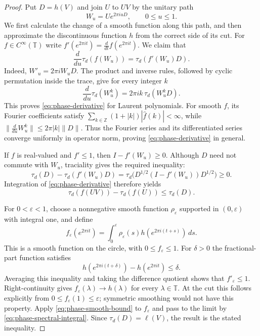\begin{proof}
Put $D=h(V)$ and join $U$ to $UV$ by the unitary path
\[
 W_u=Ue^{2\pi i uD},\qquad 0\leq u\leq1.
\]
We first calculate the change of a smooth function along this path, and
then approximate the discontinuous function $h$ from the correct side of
its cut.  For $f\in C^\infty(\mathbb T)$ write
$f'(e^{2\pi it})=\frac{d}{dt}f(e^{2\pi it})$.  We claim that
\begin{equation}\label{eq:phase-derivative}
 \frac{d}{du}\tau_d(f(W_u))=\tau_d(f'(W_u)D).
\end{equation}
Indeed, $W'_u=2\pi iW_uD$.  The product and inverse rules, followed by
cyclic permutation inside the trace, give for every integer $k$
\[
 \frac{d}{du}\tau_d(W_u^k)=2\pi i k\,\tau_d(W_u^kD).
\]
This proves \eqref{eq:phase-derivative} for Laurent polynomials.  For smooth
$f$, its Fourier coefficients satisfy
$\sum_{k\in\mathbb Z}(1+|k|)|\widehat f(k)|<\infty$, while
$\|\frac{d}{du}W_u^k\|\leq2\pi|k|\|D\|$.  Thus the Fourier series and
its differentiated series converge uniformly in operator norm, proving
\eqref{eq:phase-derivative} in general.

If $f$ is real-valued and $f'\leq1$, then $I-f'(W_u)\geq0$.  Although
$D$ need not commute with $W_u$, traciality gives the required inequality:
\[
 \tau_d(D)-\tau_d(f'(W_u)D)
 =\tau_d\bigl(D^{1/2}(I-f'(W_u))D^{1/2}\bigr)\geq0.
\]
Integration of \eqref{eq:phase-derivative} therefore yields
\begin{equation}\label{eq:phase-smooth-bound}
 \tau_d(f(UV))-\tau_d(f(U))\leq\tau_d(D).
\end{equation}

For $0<\varepsilon<1$, choose a nonnegative smooth function
$\rho_\varepsilon$ supported in $(0,\varepsilon)$ with integral one, and
define
\[
 f_\varepsilon(e^{2\pi it})
 =\int_0^\varepsilon
   \rho_\varepsilon(s)h(e^{2\pi i(t+s)})\,ds.
\]
This is a smooth function on the circle, with $0\leq f_\varepsilon\leq1$.
For $\delta>0$ the fractional-part function satisfies
\[
 h(e^{2\pi i(t+\delta)})-h(e^{2\pi it})\leq\delta.
\]
Averaging this inequality and taking the difference quotient shows that
$f'_\varepsilon\leq1$.  Right-continuity gives
$f_\varepsilon(\lambda)\to h(\lambda)$ for every $\lambda\in\mathbb T$.
At the cut this follows explicitly from
$0\leq f_\varepsilon(1)\leq\varepsilon$; symmetric smoothing would not
have this property.  Apply \eqref{eq:phase-smooth-bound} to
$f_\varepsilon$ and pass to the limit by
\eqref{eq:phase-spectral-integral}.  Since $\tau_d(D)=\ell(V)$, the
result is the stated inequality.
\end{proof}

